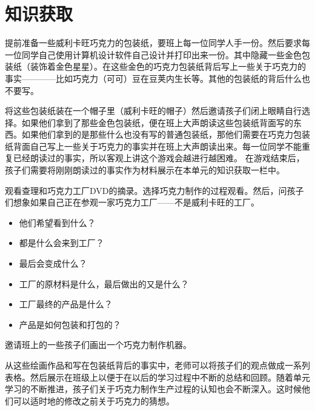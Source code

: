 \chapter{知识获取}
    提前准备一些威利卡旺巧克力的包装纸，要班上每一位同学人手一份。然后要求每一位同学自己使用计算机设计软件自己设计并打印出来一份。其中隐藏一些金色包装纸（装饰着金色星星）。在这些金色的巧克力包装纸背后写上一些关于巧克力的事实————比如巧克力（可可）豆在豆荚内生长等。其他的包装纸的背后什么也不要写。\par
    将这些包装纸装在一个帽子里（威利卡旺的帽子）然后邀请孩子们闭上眼睛自行选择。如果他们拿到了那些金色包装纸，便在班上大声朗读这些包装纸背面写的东西。如果他们拿到的是那些什么也没有写的普通包装纸，那他们需要在巧克力包装纸背面自己写上一些关于巧克力的事实并在班上大声朗读出来。每一位同学不能重复已经朗读过的事实，所以客观上讲这个游戏会越进行越困难。 在游戏结束后，孩子们需要将刚刚朗读过的事实作为材料展示在本单元的知识获取一栏中。\par
    观看查理和巧克力工厂DVD的摘录。选择巧克力制作的过程观看。然后，问孩子们想象如果自己正在参观一家巧克力工厂——不是威利卡旺的工厂。
    \begin{itemize}
        \item 他们希望看到什么？
        \item 都是什么会来到工厂？
        \item 最后会变成什么？
        \item 工厂的原材料是什么，最后做出的又是什么？
        \item 工厂最终的产品是什么？
        \item 产品是如何包装和打包的？
    \end{itemize}  
    邀请班上的一些孩子们画出一个巧克力制作机器。\par
    从这些绘画作品和写在包装纸背后的事实中，老师可以将孩子们的观点做成一系列表格。然后展示在班级上以便于在以后的学习过程中不断的总结和回顾。随着单元学习的不断推进，孩子们关于巧克力制作生产过程的认知也会不断深入。这时候他们可以适时地的修改之前关于巧克力的猜想。\par
    
